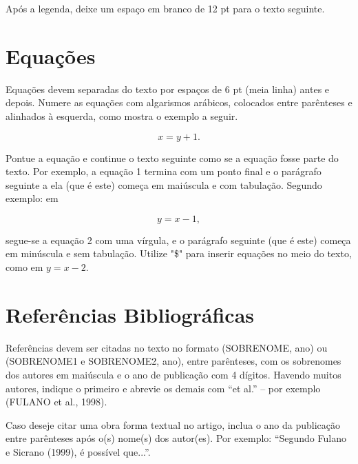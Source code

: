 \documentclass[
	article,			%
	12pt,				%
	oneside,			%
	a4paper,			%
	english,			%
	brazil,				%
	sumario=tradicional
	]{abntex2}
\begin{document}
Após a legenda, deixe um espaço em branco de 12 pt para o texto seguinte. 

\section{Equações}

Equações devem separadas do texto por espaços de 6 pt (meia linha) antes e depois.  Numere as equações com algarismos arábicos, colocados entre parênteses e alinhados à esquerda,  como mostra o exemplo a seguir.

\begin{equation}
x = y+1.
\end{equation}

Pontue a equação e continue o texto seguinte como se a equação fosse parte do texto.  Por exemplo, a equação 1 termina com um ponto final e o parágrafo seguinte a ela (que é este) começa em maiúscula e com tabulação.  Segundo exemplo: em

\begin{displaymath}
y = x-1,
\end{displaymath}

segue-se a equação 2 com uma vírgula, e o parágrafo seguinte (que é este) começa em minúscula e sem tabulação. Utilize "\$"  para inserir equações no meio do texto, como em $y=x-2$.

\section{Referências Bibliográficas}

Referências devem ser citadas no texto no formato (SOBRENOME, ano) ou (SOBRENOME1 e SOBRENOME2, ano), entre parênteses, com os sobrenomes dos autores em maiúscula e o ano de publicação com 4 dígitos.  Havendo muitos autores, indique o primeiro e abrevie os demais com “et al.” – por exemplo (FULANO et al., 1998).

Caso deseje citar uma obra forma textual no artigo, inclua o ano da publicação entre parênteses após o(s) nome(s) dos autor(es).  Por exemplo: “Segundo Fulano e Sicrano (1999), é possível que...”.


\end{document}
